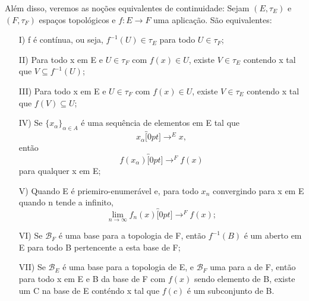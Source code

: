 \documentclass[../distribution_theory_notes.tex]{subfiles}
\begin{document}
Além disso, veremos as noções equivalentes de continuidade:
Sejam \((E, \tau_{E})\) e \((F, \tau_{F})\) espaços topológicos e \(f:E\rightarrow F\) uma aplicação. São equivalentes:
\begin{itemize}
	\item[I)] f é contínua, ou seja, \(f^{-1}(U)\in \tau_E\) para todo \(U\in \tau_F\);
	\item[II)] Para todo x em E e \(U\in \tau_{F}\) com \(f(x)\in U\), existe \(V\in \tau_{E}\) contendo x tal que \(V\subseteq f^{-1}(U)\);
	\item[III)] Para todo x em E e \(U\in \tau_{F}\) com \(f(x)\in U\), existe \(V\in \tau_{E}\) contendo x tal que \(f(V)\subseteq U\);
	\item[IV)] Se \(\{x_{\alpha }\}_{\alpha \in A}\) é uma sequência de elementos em E tal que
	      \[
		      x_{\alpha }\overbracket[0pt]{\longrightarrow}^{E}x,
	      \]
	      então
	      \[
		      f(x_{\alpha })\overbracket[0pt]{\longrightarrow}^{F}f(x)
	      \]
	      para qualquer x em E;
	\item[V)] Quando E é priemiro-enumerável e, para todo \(x_{n}\) convergindo para x em E quando n tende a infinito,
	      \[
		      \lim_{n\to \infty}f_{n}(x)\overbracket[0pt]{\longrightarrow}^{F}f(x);
	      \]
	\item[VI)] Se \(\mathcal{B}_{F}\) é uma base para a topologia de F, então \(f^{-1}(B)\) é um aberto em E para todo B pertencente a esta base de F;
	\item[VII)] Se \(\mathcal{B}_{E}\) é uma base para a topologia de E, e \(\mathcal{B}_{F} \) uma para a de F, então para todo x em E e B da base de F com \(f(x)\) sendo elemento de B, existe um C na base de E conténdo x tal que \(f(c)\) é um subconjunto de B.
\end{itemize}
\end{document}
